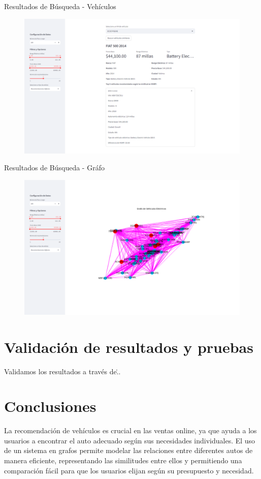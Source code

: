 \documentclass[12pt]{article}
\begin{document}
Resultados de Búsqueda - Vehículos
\begin{figure}[htbp]
    \centering
    \includegraphics[width=\textwidth]{./imgs-latex/img5.png}\label{fig:img5}
\end{figure}

Resultados de Búsqueda - Gráfo
\begin{figure}[htbp]
    \centering
    \includegraphics[width=\textwidth]{./imgs-latex/img6.png}\label{fig:img6}
\end{figure}

\section{Validación de resultados y pruebas}
Validamos los resultados a través de\...

\section{Conclusiones}
La recomendación de vehículos es crucial en las ventas online, ya que ayuda a los usuarios a encontrar el auto adecuado según sus necesidades individuales. El uso de un sistema en grafos permite modelar las relaciones entre diferentes autos de manera eficiente, representando las similitudes entre ellos y permitiendo una comparación fácil para que los usuarios elijan según su presupuesto y necesidad.
\end{document}
